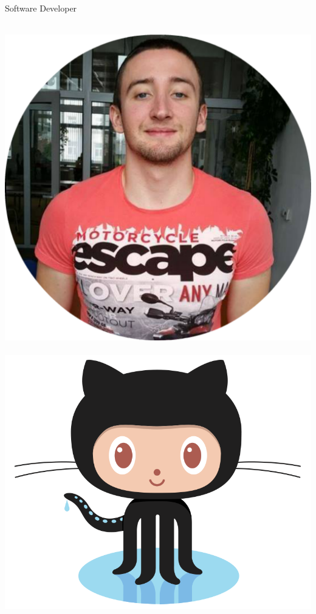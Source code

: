 \documentclass[]{friggeri-cv}
\begin{document}
      {Software Developer}
      

    
\begin{aside}
    ~
    \includegraphics[scale=0.11]{img/my_pic_circle.png}
    ~
    \includegraphics[scale=0.05]{img/github_logo.png}

\end{aside}
\end{document}
